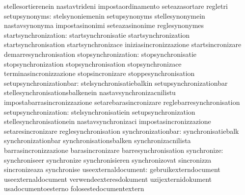                                   stellesortierenein               nastavtrideni
                                  impostaordinamento               seteazasortare
                                  regletri
                   setupsynonyms: stelsynoniemenin                 setupsynonyms
                                  stellesynonymein                 nastavsynonyma
                                  impostasinonimi                  seteazasinonime
                                  reglesynonymes
            startsynchronization: startsynchronisatie              startsynchronization
                                  startsynchronisation             startsynchronizace
                                  iniziasincronizzazione           startsincronizare
                                  demarresynchronisation
             stopsynchronization: stopsynchronisatie               stopsynchronization
                                  stopsynchronisation              stopsynchronizace
                                  terminasincronizzazione          stopsincronizare
                                  stoppesynchronisation
         setupsynchronizationbar: stelsynchronisatiebalkin         setupsynchronizationbar
                                  stellesynchronisationsbalkenein  nastavsynchronizacnilistu
                                  impostabarrasincronizzazione     setarebarasincronizare
                                  reglebarresynchronisation
            setupsynchronization: stelsynchronisatiein             setupsynchronization
                                  stellesynchronisationein         nastavsynchronizaci
                                  impostasincronizzazione          setaresincronizare
                                  reglesynchronisation
              synchronizationbar: synchronisatiebalk               synchronizationbar
                                  synchronisationsbalken           synchronizacnilista
                                  barrasincronizzazione            barasincronizare
                                  barresynchronisation
                     synchronize: synchroniseer                    synchronize
                                  synchronisieren                  synchronizovat
                                  sincronizza                      sincronizeaza
                                  synchronise
             useexternaldocument: gebruikexterndocument            useexternaldocument
                                  verwendeexteresdokument          uzijexternidokument
                                  usadocumentoesterno              folosestedocumentextern
